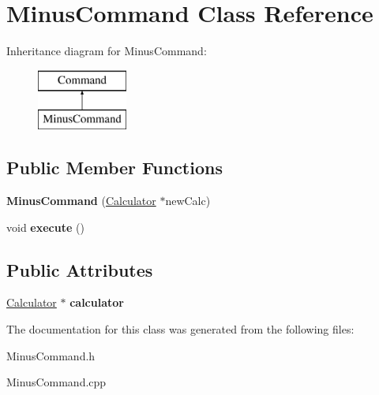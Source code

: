 \hypertarget{class_minus_command}{}\section{Minus\+Command Class Reference}
\label{class_minus_command}
Inheritance diagram for Minus\+Command\+:\begin{figure}[H]
\begin{center}
\leavevmode
\includegraphics[height=2.000000cm]{class_minus_command}
\end{center}
\end{figure}
\subsection*{Public Member Functions}
\begin{DoxyCompactItemize}
\item 
\hypertarget{class_minus_command_a9304469f5f5baa79902bd21e81fb3526}{}{\bfseries Minus\+Command} (\hyperlink{class_calculator}{Calculator} $\ast$new\+Calc)\label{class_minus_command_a9304469f5f5baa79902bd21e81fb3526}

\item 
\hypertarget{class_minus_command_a117f4a7fb5f380d968e057ee9efad956}{}void {\bfseries execute} ()\label{class_minus_command_a117f4a7fb5f380d968e057ee9efad956}

\end{DoxyCompactItemize}
\subsection*{Public Attributes}
\begin{DoxyCompactItemize}
\item 
\hypertarget{class_minus_command_a659a458964a22955e73022f23c8a2f7e}{}\hyperlink{class_calculator}{Calculator} $\ast$ {\bfseries calculator}\label{class_minus_command_a659a458964a22955e73022f23c8a2f7e}

\end{DoxyCompactItemize}


The documentation for this class was generated from the following files\+:\begin{DoxyCompactItemize}
\item 
Minus\+Command.\+h\item 
Minus\+Command.\+cpp\end{DoxyCompactItemize}
